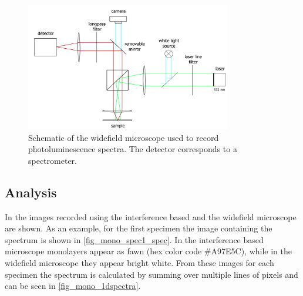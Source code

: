 \begin{figure}[!ht]
    \centering
    \includegraphics[width=0.8\textwidth]{img/setup1.png}
    \caption{Schematic of the widefield microscope used to record photoluminescence spectra. The detector corresponds to a spectrometer.}
    \label{fig_widefield}
\end{figure}


\subsection{Analysis}

In  the images recorded using the interference based and the widefield microscope are shown.
As an example, for the first specimen the image containing the spectrum is shown in \cref{fig_mono_spec1_spec}.
In the interference based microscope monolayers appear as fawn (hex color code \#A97E5C), while in the widefield microscope they appear bright white.
From these images for each specimen the spectrum is calculated by summing over multiple lines of pixels and can be seen in \cref{fig_mono_1dspectra}.

